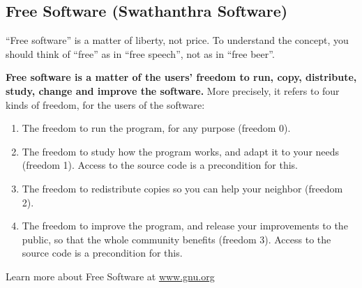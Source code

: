 \newpage
\begin{english}
\section*{Free Software (Swathanthra Software)}

“Free software” is a matter of liberty, not price. To understand the concept, you should think of “free” as in “free speech”, not as in “free beer”.

\textbf{Free software is a matter of the users' freedom to run, copy, distribute, study, change and improve the software.} More precisely, it refers to four kinds of freedom, for the users of the software:
\begin{enumerate}
 \itemsep0em
 \item The freedom to run the program, for any purpose (freedom 0).
 \item The freedom to study how the program works, and adapt it to your needs (freedom 1). Access to the source code is a precondition for this.
 \item The freedom to redistribute copies so you can help your neighbor (freedom 2).
 \item The freedom to improve the program, and release your improvements to the public, so that the whole community benefits (freedom 3). Access to the source code is a precondition for this.
\end{enumerate}

Learn more about Free Software at \url{www.gnu.org}
\end{english}
